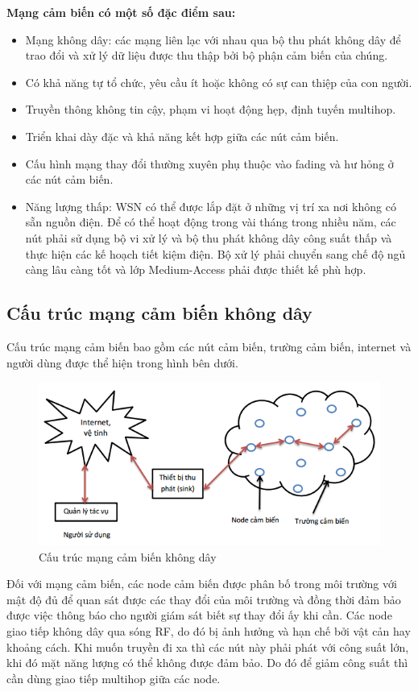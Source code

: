 \documentclass{report}
\begin{document}
\textbf{Mạng cảm biến có một số đặc điểm sau:}
\begin{itemize}
\item Mạng không dây: các mạng liên lạc với nhau qua bộ thu phát không dây để trao đổi và xử lý dữ liệu được thu thập bởi bộ phận cảm biến của chúng. 
\item Có khả năng tự tổ chức, yêu cầu ít hoặc không có sự can thiệp của con người.
\item Truyền thông không tin cậy, phạm vi hoạt động hẹp, định tuyến multihop.
\item Triển khai dày đặc và khả năng kết hợp giữa các nút cảm biến.
\item Cấu hình mạng thay đổi thường xuyên phụ thuộc vào fading và hư hỏng ở các nút cảm
biến.
\item Năng lượng thấp: WSN có thể được lắp đặt ở những vị trí xa nơi không có sẵn nguồn điện. Để có thể hoạt động trong vài tháng trong nhiều năm, các nút phải sử dụng bộ vi xử lý và bộ thu phát không dây công suất thấp và thực hiện các kế hoạch tiết kiệm điện. Bộ xử lý phải chuyển sang chế độ ngủ càng lâu càng tốt và lớp Medium-Access phải được thiết kế phù hợp. 
\end{itemize}
\newpage
\subsection{Cấu trúc mạng cảm biến không dây}
Cấu trúc mạng cảm biến bao gồm các nút cảm biến, trường cảm biến, internet và người dùng được thể hiện trong hình bên dưới.
\begin{figure}[h]
	\centering
	\includegraphics[scale = 0.7]{fig3.png}
	\caption{Cấu trúc mạng cảm biến không dây}
	\label{fig:Graph3}
\end{figure}

Đối với mạng cảm biến, các node cảm biến được phân bố trong môi trường với mật độ đủ để quan sát được các thay đổi của môi trường và đồng thời đảm bảo được việc thông báo cho người giám sát biết sự thay đổi ấy khi cần. Các node giao tiếp không dây qua sóng RF, do đó bị ảnh hưởng và hạn chế bởi vật cản hay khoảng cách. Khi muốn truyền đi xa thì các nút này phải phát với công suất lớn, khi đó mặt năng lượng có thể không được đảm bảo. Do đó để giảm công suất thì cần dùng giao tiếp multihop giữa các node. \\
\end{document}
